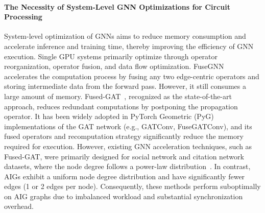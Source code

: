 \paragraph{The Necessity of System-Level GNN Optimizations for Circuit Processing}
System-level optimization of GNNs aims to reduce memory consumption and accelerate inference and training time, thereby improving the efficiency of GNN execution. 
Single GPU systems primarily optimize through operator reorganization, operator fusion, and data flow optimization. FuseGNN~\citep{fusegnn} accelerates the computation process by fusing any two edge-centric operators and storing intermediate data from the forward pass. However, it still consumes a large amount of memory. Fused-GAT~\citep{fusegat}, recognized as the state-of-the-art approach, reduces redundant computations by postponing the propagation operator. It has been widely adopted in PyTorch Geometric (PyG)~\citep{pyg} implementations of the GAT network (e.g., GATConv, FuseGATConv), and its fused operators and recomputation strategy significantly reduce the memory required for execution. 
However, existing GNN acceleration techniques, such as Fused-GAT, were primarily designed for social network and citation network datasets, where the node degree follows a power-law distribution~\citep{powerlaw}. In contrast, AIGs exhibit a uniform node degree distribution and have significantly fewer edges (1 or 2 edges per node). 
Consequently, these methods perform suboptimally on AIG graphs due to imbalanced workload and substantial synchronization overhead.

\vspace{-5pt}

